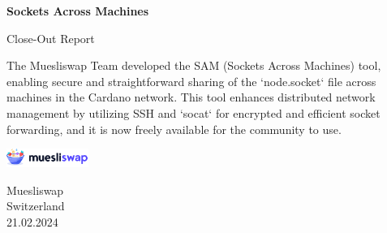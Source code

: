 \begin{titlepage}
   \begin{center}
       \vspace*{1cm}

       \Huge
       \textbf{Sockets Across Machines}

       \vspace{0.5cm}
       \Large
            Close-Out Report
       \vspace{1.5cm}

       \vfill
            
       The Muesliswap Team developed the SAM (Sockets Across Machines) tool, enabling secure and straightforward sharing of the `node.socket` file across machines in the Cardano network. This tool enhances distributed network management by utilizing SSH and `socat` for encrypted and efficient socket forwarding, and it is now freely available for the community to use.

       \vspace{0.8cm}
     
       \includegraphics[width=0.2\textwidth]{muesliswap_logo.png}
            
       Muesliswap\\
       Switzerland\\
       21.02.2024
            
   \end{center}
\end{titlepage}
